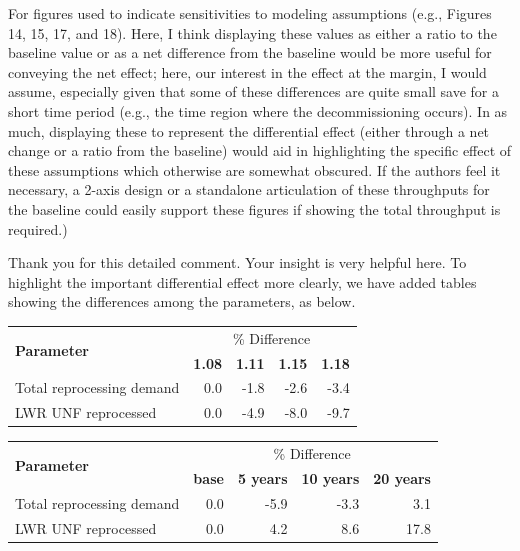 \documentclass[answers,11pt]{exam}
\begin{document}
\begin{questions}
        \question For figures used to indicate sensitivities to modeling 
        assumptions (e.g., Figures 14, 15, 17, and 18). Here, I think 
        displaying these values as either a ratio to the baseline value or as a 
        net difference from the baseline would be more useful for conveying the 
        net effect; here, our interest in the effect at the margin, I would 
        assume, especially given that some of these differences are quite small 
        save for a short time period (e.g., the time region where the 
        decommissioning occurs). In as much, displaying these to represent the 
        differential effect (either through a net change or a ratio from the 
        baseline) would aid in highlighting the specific effect of these 
        assumptions which otherwise are somewhat obscured. If the authors feel 
        it necessary, a 2-axis design or a standalone articulation of these 
        throughputs for the baseline could easily support these figures if 
        showing the total throughput is required.)

        \begin{solution}
                Thank you for this detailed comment. Your insight is very 
                helpful here. To highlight the important differential effect
                 more clearly, we have added tables showing the 
                differences among the parameters, as below.
                
                
                \begin{tabular}{lrrrr}
                	\hline
                	\multirow{2}{*}{\textbf{Parameter}} & \multicolumn{4}{c}{\% Difference} \\
                	& \textbf{1.08}& \textbf{1.11} & \textbf{1.15} & \textbf{1.18} \\
                	\hline
                	Total reprocessing demand & 0.0 & -1.8 & -2.6 & -3.4 \\ 
                	LWR UNF reprocessed & 0.0  & -4.9 & -8.0 & -9.7 \\
                	\hline
                \end{tabular}
                
                	\begin{tabular}{lrrrr}
                		\hline
                		\multirow{2}{*}{\textbf{Parameter}} & \multicolumn{4}{c}{\% Difference} \\
                		& \textbf{base}& \textbf{5 years} & \textbf{10 years} & \textbf{20 years} \\
                		\hline
                		Total reprocessing demand & 0.0 & -5.9 & -3.3 & 3.1 \\
                		LWR UNF reprocessed & 0.0  & 4.2 & 8.6 & 17.8 \\
                		\hline
                	\end{tabular}
                

\end{solution}
\end{questions}
\end{document}
